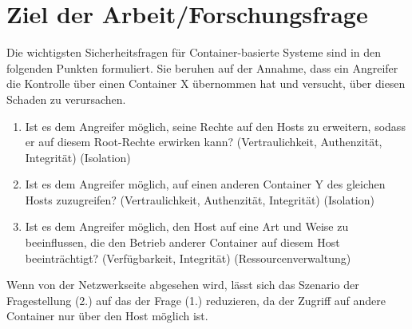 \documentclass[../main.tex]{subfiles}
\begin{document}
\chapter{Ziel der Arbeit/Forschungsfrage}
\label{question}


  Die wichtigsten Sicherheitsfragen für Container-basierte Systeme sind in den folgenden Punkten formuliert. Sie beruhen auf der Annahme, dass ein Angreifer die Kontrolle über einen Container X übernommen hat und versucht, über diesen Schaden zu verursachen.

  \begin{enumerate}
    \item Ist es dem Angreifer möglich, seine Rechte auf den Hosts zu erweitern, sodass er auf diesem Root-Rechte erwirken kann? (Vertraulichkeit, Authenzität, Integrität) (Isolation)
    \item Ist es dem Angreifer möglich, auf einen anderen Container Y des gleichen Hosts zuzugreifen? (Vertraulichkeit, Authenzität, Integrität) (Isolation)
    \item Ist es dem Angreifer möglich, den Host auf eine Art und Weise zu beeinflussen, die den Betrieb anderer Container auf diesem Host beeinträchtigt? (Verfügbarkeit, Integrität) (Ressourcenverwaltung)
  \end{enumerate}

  Wenn von der Netzwerkseite abgesehen wird, lässt sich das Szenario der Fragestellung (2.) auf das der Frage (1.) reduzieren, da der Zugriff auf andere Container nur über den Host möglich ist.

\end{document}
